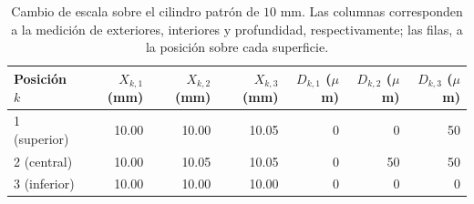\begin{table}[H]
\centering
\caption{Cambio de escala sobre el cilindro patrón de $10$ mm. Las columnas corresponden a la medición de exteriores, interiores y profundidad, respectivamente; las filas, a la posición sobre cada superficie.}
\label{tab:pie-rey-cilindro}
\begin{tabular}{lrrrrrr}
\toprule
Posición $k$ & $X_{k,1}$ (mm) & $X_{k,2}$ (mm) & $X_{k,3}$ (mm) & $D_{k,1}$ ($\mu$m) & $D_{k,2}$ ($\mu$m) & $D_{k,3}$ ($\mu$m) \\
\midrule
1 (superior) & 10.00 & 10.00 & 10.05 & 0 & 0 & 50 \\
2 (central) & 10.00 & 10.05 & 10.05 & 0 & 50 & 50 \\
3 (inferior) & 10.00 & 10.00 & 10.00 & 0 & 0 & 0 \\
\bottomrule
\end{tabular}
\end{table}
